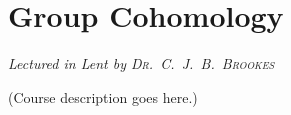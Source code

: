 \chapter[Group Cohomology \\ \textnormal{\emph{Lectured in Lent \oldstylenums{2024} by \textsc{Dr.\ C.\ J.\ B.\ Brookes}}}]{Group Cohomology}
\emph{\Large Lectured in Lent  by \textsc{Dr.\ C.\ J.\ B.\ Brookes}}

(Course description goes here.)


